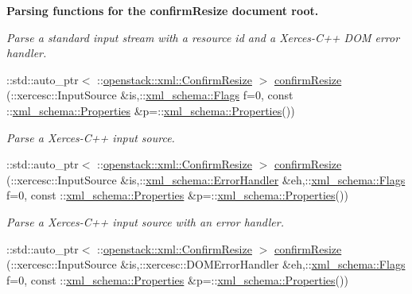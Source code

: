 \begin{Indent}{\bf Parsing functions for the confirmResize document root.}
\begin{DoxyCompactItemize}
\begin{DoxyCompactList}\small\item\em Parse a standard input stream with a resource id and a Xerces-\/C++ DOM error handler. \item\end{DoxyCompactList}\item 
::std::auto\_\-ptr$<$ ::\hyperlink{classopenstack_1_1xml_1_1ConfirmResize}{openstack::xml::ConfirmResize} $>$ \hyperlink{namespaceopenstack_1_1xml_add08ccf01996a3ea880b2705724dae8a}{confirmResize} (::xercesc::InputSource \&is,::\hyperlink{namespacexml__schema_affb4c227cbd9aa7453dd1dc5a1401943}{xml\_\-schema::Flags} f=0, const ::\hyperlink{namespacexml__schema_ad27ce19a7ee1d3b1064092648898f64c}{xml\_\-schema::Properties} \&p=::\hyperlink{namespacexml__schema_ad27ce19a7ee1d3b1064092648898f64c}{xml\_\-schema::Properties}())
\begin{DoxyCompactList}\small\item\em Parse a Xerces-\/C++ input source. \item\end{DoxyCompactList}\item 
::std::auto\_\-ptr$<$ ::\hyperlink{classopenstack_1_1xml_1_1ConfirmResize}{openstack::xml::ConfirmResize} $>$ \hyperlink{namespaceopenstack_1_1xml_a56048426610c56087d49a54dd58b5d51}{confirmResize} (::xercesc::InputSource \&is,::\hyperlink{namespacexml__schema_ab1c9361bfd3b404eaabf0c31eded79dc}{xml\_\-schema::ErrorHandler} \&eh,::\hyperlink{namespacexml__schema_affb4c227cbd9aa7453dd1dc5a1401943}{xml\_\-schema::Flags} f=0, const ::\hyperlink{namespacexml__schema_ad27ce19a7ee1d3b1064092648898f64c}{xml\_\-schema::Properties} \&p=::\hyperlink{namespacexml__schema_ad27ce19a7ee1d3b1064092648898f64c}{xml\_\-schema::Properties}())
\begin{DoxyCompactList}\small\item\em Parse a Xerces-\/C++ input source with an error handler. \item\end{DoxyCompactList}\item 
::std::auto\_\-ptr$<$ ::\hyperlink{classopenstack_1_1xml_1_1ConfirmResize}{openstack::xml::ConfirmResize} $>$ \hyperlink{namespaceopenstack_1_1xml_a5f299e4827166c2acac61133011c405c}{confirmResize} (::xercesc::InputSource \&is,::xercesc::DOMErrorHandler \&eh,::\hyperlink{namespacexml__schema_affb4c227cbd9aa7453dd1dc5a1401943}{xml\_\-schema::Flags} f=0, const ::\hyperlink{namespacexml__schema_ad27ce19a7ee1d3b1064092648898f64c}{xml\_\-schema::Properties} \&p=::\hyperlink{namespacexml__schema_ad27ce19a7ee1d3b1064092648898f64c}{xml\_\-schema::Properties}())

\end{DoxyCompactItemize}
\end{Indent}

